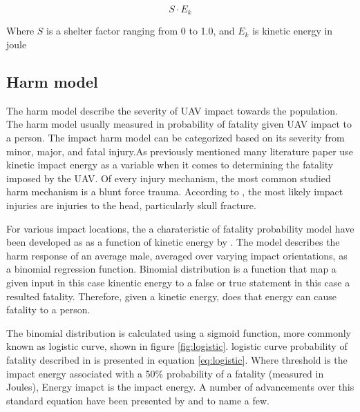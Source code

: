 \documentclass[12pt]{report}
\begin{document}
            \begin{equation}\label{eq:shelter_factor}
                S \cdot E_k
            \end{equation}

            Where \(S\) is a shelter factor ranging from 0 to 1.0, and \(E_k\) is kinetic energy in joule
            
        \subsection{Harm model}
            The harm model describe the severity of UAV impact towards the population. The harm model usually measured
            in probability of fatality given UAV impact to a person. The impact harm model can be categorized based on
            its severity from minor, major, and fatal injury.As previously mentioned many literature paper use kinetic
            impact energy as a variable when it comes to determining the fatality imposed by the UAV.  Of every injury
            mechanism, the most common studied harm mechanism is a blunt force trauma. According to
            \cite{shelley_model_2016}, the most likely impact injuries are injuries to the head, particularly skull
            fracture. 

            For various impact locations, the a charateristic of fatality probability model have been developed as as a
            function of kinetic energy by \cite{harwick_approved_2007}. The model describes the harm response of an
            average male, averaged over varying impact orientations, as a binomial regression function. Binomial
            distribution is a function that map a given input in this case kinentic energy to a false or true statement
            in this case a resulted fatality. Therefore, given a kinetic energy, does that energy can cause fatality to
            a person. 
            
            The binomial distribution is calculated using a sigmoid function, more commonly known as logistic curve,
            shown in figure \ref{fig:logistic}. logistic curve probability of fatality described in
            \cite{shelley_model_2016} is presented in equation \ref{eq:logistic}. Where threshold is the impact energy
            associated with a 50\% probability of a fatality (measured in Joules), Energy imapct is the impact energy. A
            number of advancements over this standard equation have been presented by
            \cite{dalamagkidis_evaluating_2008} and \cite{shelley_model_2016} to name a few.
\end{document}

